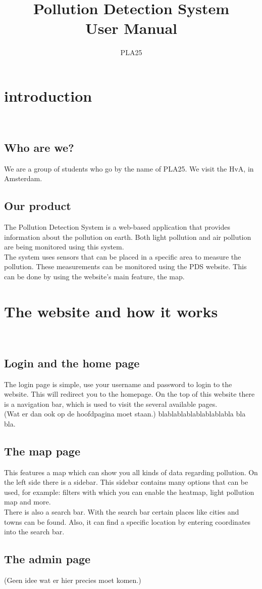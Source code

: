 \documentclass[a4paper]{article}
\title{Pollution Detection System\\User Manual}
\author{PLA25}
\begin{document}
\clearpage
\maketitle
\thispagestyle{empty}
\setcounter{page}{0}
\pagebreak
\tableofcontents
\pagebreak

\section{introduction}
~\\

\subsection{Who are we?}
We are a group of students who go by the name of PLA25. We visit the HvA, in Amsterdam.
~\\

\subsection{Our product}
The Pollution Detection System is a web-based application that provides information about the pollution on earth. Both light pollution and air pollution are being monitored using this system.
\\
\indent
The system uses sensors that can be placed in a specific area to measure the pollution. These measurements can be monitored using the PDS website. This can be done by using the website's main feature, the map.

\pagebreak

\section{The website and how it works}
~\\

\subsection{Login and the home page}
The login page is simple, use your username and password to login to the website. This will redirect you to the homepage. On the top of this website there is a navigation bar, which is used to visit the several available pages.
\\
\indent
(Wat er dan ook op de hoofdpagina moet staan.) blablablablablablablabla bla bla.
~\\

\subsection{The map page}
This features a map which can show you all kinds of data regarding pollution. On the left side there is a sidebar. This sidebar contains many options that can be used, for example: filters with which you can enable the heatmap, light pollution map and more.
\\
\indent
There is also a search bar. With the search bar certain places like cities and towns can be found. Also, it can find a specific location by entering coordinates into the search bar.
~\\

\subsection{The admin page}
(Geen idee wat er hier precies moet komen.)
\end{document}
